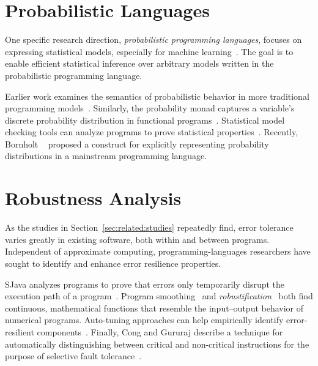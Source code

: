 \section{Probabilistic Languages}

One specific research direction, \emph{probabilistic programming languages},
focuses on expressing statistical models, especially for machine
learning~\cite{BBGR13, wingate-lightweight, church, chaganty, pfeffersample,
probdsl, koller, sriram-pldi}.
The goal is to enable efficient statistical inference over arbitrary models
written in the probabilistic programming language.

Earlier work examines the semantics of probabilistic behavior in more
traditional programming models~\cite{kozen}.
Similarly, the probability monad captures a variable's discrete probability
distribution in functional programs~\cite{pmonad}.
Statistical model checking tools can analyze programs to prove statistical
properties~\cite{legay10, KNP11}.
Recently, Bornholt \etal~\cite{uncertaint} proposed a construct for explicitly representing
probability distributions in a mainstream programming language.


\section{Robustness Analysis}

As the studies in Section~\ref{sec:related:studies} repeatedly find, error
tolerance varies greatly in existing software, both within and between
programs.
Independent of approximate computing, programming-languages researchers have
sought to identify and enhance error resilience properties.

SJava analyzes programs to prove that
errors only temporarily disrupt the execution path of a program~\cite{sjava}.
Program smoothing~\cite{smoothing-cav, smoothing-pldi, smoothing-fse} and
\textit{robustification}~\cite{robustification} both find continuous, mathematical
functions that resemble the input--output behavior of numerical programs.
Auto-tuning approaches can help empirically identify error-resilient
components~\cite{asac}.
Finally, Cong and Gururaj describe a technique for automatically
distinguishing between critical and non-critical instructions for the purpose
of selective fault tolerance~\cite{cong-iccad}.
